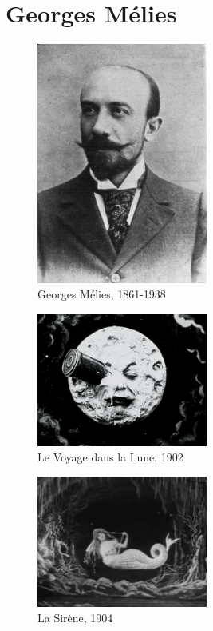 \documentclass[
]{book}
\begin{document}
\hypertarget{georges-muxe9lies}{%
\section{Georges Mélies}\label{georges-muxe9lies}}

\begin{figure}
\centering
\includegraphics[width=0.5\textwidth,height=\textheight]{medias/corpus/melies/George_Melies.jpg}
\caption{Georges Mélies, 1861-1938}
\end{figure}

\begin{figure}
\centering
\includegraphics[width=0.5\textwidth,height=\textheight]{medias/corpus/melies/voyage_dans_la_lune.gif}
\caption{Le Voyage dans la Lune, 1902}
\end{figure}

\begin{figure}
\centering
\includegraphics[width=0.5\textwidth,height=\textheight]{medias/corpus/melies/sirene_1904.gif}
\caption{La Sirène, 1904}
\end{figure}
\end{document}
